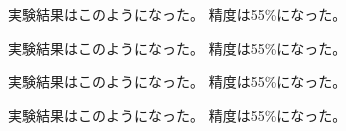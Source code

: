実験結果はこのようになった。%
精度は55\%になった。

実験結果はこのようになった。%
精度は55\%になった。

実験結果はこのようになった。%
精度は55\%になった。

実験結果はこのようになった。%
精度は55\%になった。

